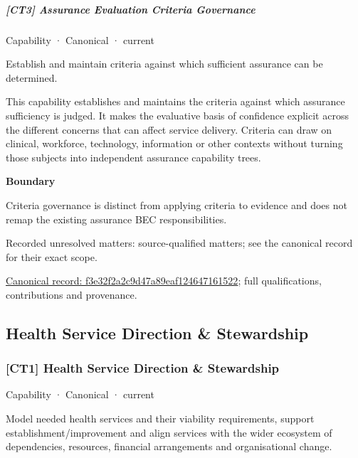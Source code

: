 \subparagraph{[CT3] Assurance Evaluation Criteria Governance}

\label{element:f3e32f2a2c9d47a89eaf124647161522}
{\small Capability · Canonical · current}\par

Establish and maintain criteria against which sufficient assurance can be determined.



This capability establishes and maintains the criteria against which assurance sufficiency is judged. It makes the evaluative basis of confidence explicit across the different concerns that can affect service delivery. Criteria can draw on clinical, workforce, technology, information or other contexts without turning those subjects into independent assurance capability trees.



\textbf{Boundary}



Criteria governance is distinct from applying criteria to evidence and does not remap the existing assurance BEC responsibilities.


{\small Recorded unresolved matters: source-qualified matters; see the canonical record for their exact scope.}\par
{\footnotesize \href{../../../../continuum/strategy/capability/f3e32f2a2c9d47a89eaf124647161522.md}{Canonical record: f3e32f2a2c9d47a89eaf124647161522}; full qualifications, contributions and provenance.}\par
\subsection{Health Service Direction \& Stewardship}

\subsubsection{[CT1] Health Service Direction \& Stewardship}

\label{element:d51e7125bf9c4d2c9c59b60346b4d86f}
{\small Capability · Canonical · current}\par

Model needed health services and their viability requirements, support establishment/improvement and align services with the wider ecosystem of dependencies, resources, financial arrangements and organisational change.



